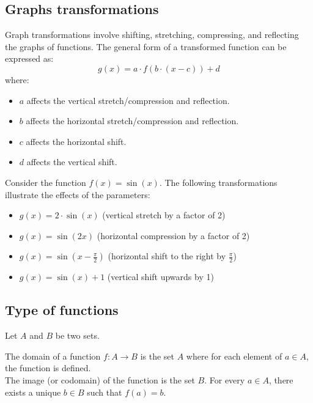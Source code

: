 \subsection{Graphs transformations}
\begin{definition}
    Graph transformations involve shifting, stretching, compressing, and reflecting the graphs of functions. The general form of a transformed function can be expressed as:
    \[
    g(x) = a \cdot f(b \cdot (x - c)) + d
    \]
where:
\begin{itemize}[itemsep=1pt,label=$\circ$]
    \item $a$ affects the vertical stretch/compression and reflection.
    \item $b$ affects the horizontal stretch/compression and reflection.
    \item $c$ affects the horizontal shift.
    \item $d$ affects the vertical shift.
\end{itemize}
\end{definition}

\begin{eg}
    Consider the function $f(x) = \sin(x)$. The following transformations illustrate the effects of the parameters:
    \begin{itemize}[itemsep=1pt,label=$\circ$]
        \item $g(x) = 2 \cdot \sin(x)$ (vertical stretch by a factor of 2)
        \item $g(x) = \sin(2x)$ (horizontal compression by a factor of 2)
        \item $g(x) = \sin(x - \frac{\pi}{2})$ (horizontal shift to the right by $\frac{\pi}{2}$)
        \item $g(x) = \sin(x) + 1$ (vertical shift upwards by 1)
    \end{itemize}
\end{eg}

\subsection{Type of functions}
Let $A$ and $B$ be two sets.

\begin{definition}
    The domain of a function $f: A \to B$ is the set $A$ where for each element of $a \in A$, the function is defined.
    \\
    The image (or codomain) of the function is the set $B$. For every $a \in A$, there exists a unique $b \in B$ such that $f(a) = b$.
\end{definition}

